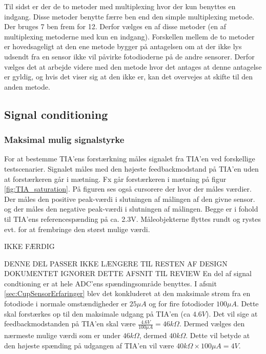\documentclass[HardwareDesign/HardwareDesign_main.tex]{subfiles}
\begin{document}
Til sidst er der de to metoder med multiplexing hvor der kun benyttes en indgang. Disse metoder benytte færre ben end den simple multiplexing metode. Der bruges 7 ben frem for 12. Derfor vælges en af disse metoder (en af multiplexing metoderne med kun en indgang). Forskellen mellem de to metoder er hovedsageligt at den ene metode bygger på antagelsen om at der ikke lys udsendt fra en sensor ikke vil påvirke fotodioderne på de andre sensorer. Derfor vælges det at arbejde videre med den metode hvor det antages at denne antagelse er gyldig, og hvis det viser sig at den ikke er, kan det overvejes at skifte til den anden metode.

\subsection{Signal conditioning}

\subsubsection{Maksimal mulig signalstyrke}
{
For at bestemme TIA'ens forstærkning måles signalet fra TIA'en ved forskellige testscenarier. Signalet måles med den højeste feedbackmodstand på TIA'en uden at forstærkeren går i mætning. Fx går forstærkeren i mætning på figur \ref{fig:TIA_saturation}. På figuren ses også cursorere der hvor der måles værdier. Der måles den positive peak-værdi i slutningen af målingen af den givne sensor. og der måles den negative peak-værdi i slutningen af målingen. Begge er i fohold til TIA'ens referencespænding på ca. 2.3V. Måleobjekterne flyttes rundt og rystes evt. for at frembringe den størst mulige værdi.

IKKE FÆRDIG
}

DENNE DEL PASSER IKKE LÆNGERE TIL RESTEN AF DESIGN DOKUMENTET IGNORER DETTE AFSNIT TIL REVIEW
En del af signal condtioning er at hele ADC'ens spændingsområde benyttes. I afsnit \ref{sec:CupSensorErfaringer} blev det konkluderet at den maksimale strøm fra en fotodiode i normale omstændigheder er $25\si{\mu A}$  og for fire fotodioder $100\si{\mu A}$. Dette skal forstærkes op til den maksimale udgang på TIA'en (ca $4.6\si{V}$). Det vil sige at feedbackmodstanden på TIA'en skal være $\frac{4.6\si{V}}{100\si{\mu A}} = 46\si{k\Omega}$. Dermed vælges den nærmeste mulige værdi som er under $46\si{k\Omega}$, dermed $40\si{k\Omega}$. Dette vil betyde at den højeste spænding på udgangen af TIA'en vil være $40\si{k\Omega} \times 100\si{\mu A} = 4\si{V}$.
\end{document}
